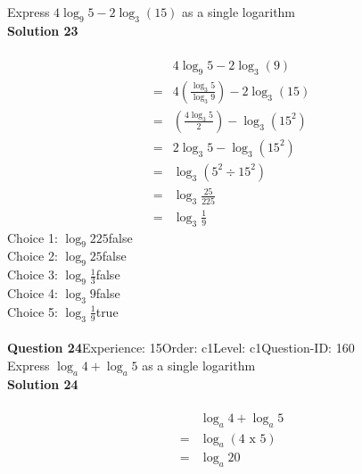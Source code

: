 \documentclass{article}
\begin{document}
Express $4\log_{9}5-2\log_{3}(15)$ as a single logarithm\\[4pt]
\noindent\textbf{Solution 23}\\[2pt]
\\[-35pt]\begin{align*}
&4\log_{9}5-2\log_{3}(9)\\[2pt]
=&4\left(\displaystyle\frac{\log_{3}5}{\log_{3}9}\right)-2\log_{3}(15)\\[2pt]
=&\left(\displaystyle\frac{4\log_{3}5}{2}\right)-\log_{3}(15^2)\\[2pt]
=&2\log_{3}5-\log_{3}(15^2)\\[2pt]
=&\log_{3}(5^2 \div 15^2)\\[2pt]
=&\log_{3}\displaystyle\frac{25}{225}\\[2pt]
=&\log_{3}\displaystyle\frac{1}{9}
\end{align*}
Choice 1: \hspace{20pt}$\log_{9}225$\hspace{20pt}false\\
Choice 2: \hspace{20pt}$\log_{9}25$\hspace{20pt}false\\
Choice 3: \hspace{20pt}$\log_{9}\displaystyle\frac{1}{3}$\hspace{20pt}false\\
Choice 4: \hspace{20pt}$\log_{3}9$\hspace{20pt}false\\
Choice 5: \hspace{20pt}$\log_{3}\displaystyle\frac{1}{9}$\hspace{20pt}true\\
\\[4pt]
\noindent\textbf{Question 24}\hspace{20pt}Experience: 15\hspace{20pt}Order: c1\hspace{20pt}Level: c1\hspace{20pt}Question-ID: 160\\[2pt]
Express $\log_{a}4+\log_{a}5$ as a single logarithm\\[4pt]
\noindent\textbf{Solution 24}\\[2pt]
\\[-35pt]\begin{align*}
&\log_{a}4+\log_{a}5\\[2pt]
=&\log_{a}(4 \,\, \text{x} \,\, 5)\\[2pt]
=&\log_{a}20
\end{align*}
\end{document}
